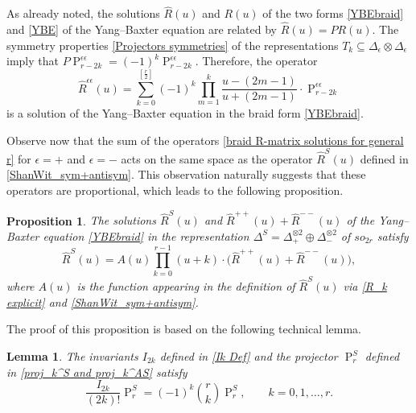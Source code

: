 \documentclass[a4paper]{article}
\newcommand{\hR}{\hat{R}}
\renewcommand{\=}{\ =\ }
\DeclareMathOperator{\proj}{P}
\numberwithin{equation}{section}
\newtheorem{proposition}{Proposition}
\newtheorem{lemma}{Lemma}
\theoremstyle{remark}
\begin{document}
As already noted, the solutions $\hR(u)$ and $R(u)$ of the two forms
\eqref{YBEbraid} and \eqref{YBE} of the Yang--Baxter equation are related by $\hR(u)=PR(u)$.
The symmetry properties \eqref{Projectors symmetries} of the representations
$T_k\subseteq \Delta_\epsilon\otimes \Delta_\epsilon$ imply that $P \proj_{r-2k}^{\epsilon\epsilon}
= (-1)^k\proj_{r-2k}^{\epsilon\epsilon}$. Therefore, the operator
\begin{equation}\label{braid R-matrix solutions for general r}
\hR^{\epsilon\epsilon}(u) = \sum_{k=0}^{[\frac{r}{2}]} (-1)^k \prod_{m=1}^{k} \frac{u-(2m-1)}{u+(2m-1)} \cdot  \proj_{r-2k}^{\epsilon\epsilon}
\end{equation}
is a solution of the Yang--Baxter equation in the braid form \eqref{YBEbraid}.

Observe now that the sum of the operators \eqref{braid R-matrix solutions for general r}
for $\epsilon=+$ and $\epsilon=-$ acts on the same space as the operator
$\hR^S(u)$ defined in \eqref{ShanWit_sym+antisym}.
This observation naturally suggests that these operators are proportional, which leads to the following proposition.

\begin{proposition}\label{R^+ and R^++ + R^-- relation}
The solutions $\hR^S(u)$ and $\hR^{++}(u)+\hR^{--}(u)$ of the Yang--Baxter equation \eqref{YBEbraid} in the representation $\Delta^S=\Delta_+^{\otimes 2}\oplus \Delta_-^{\otimes 2}$ of $so_{2r}$ satisfy
\begin{equation}\label{ShanWit_and_our_solutions}
\hR^S(u) = A(u) \prod_{k=0}^{r-1}(u+k) \cdot \bigl(\hR^{++}(u)+\hR^{--}(u)\bigr),
\end{equation}
where $A(u)$ is the function appearing in the definition of $\hR^S(u)$ via \eqref{R_k explicit} and \eqref{ShanWit_sym+antisym}.
\end{proposition}

The proof of this proposition is based on the following technical lemma.

\begin{lemma}\label{Lemma: I_2k proj_r identity}
The invariants $I_{2k}$ defined in \eqref{Ik Def} and the projector $\proj_r^S$ defined in \eqref{proj_k^S and proj_k^AS} satisfy
\begin{equation}\label{I_2k times proj_r}
\frac{I_{2k}}{(2k)!}\proj_r^S = (-1)^k \binom{r}{k} \proj_r^S, \qquad k=0,1,\dots,r.
\end{equation}
\end{lemma}
\end{document}
